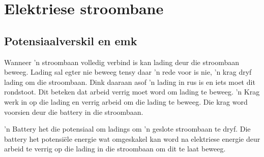 \chapter{Elektriese stroombane}

\section{Potensiaalverskil en emk}

Wanneer 'n stroombaan volledig verbind is kan lading deur die stroombaan
beweeg. Lading sal egter nie beweeg tensy daar 'n rede voor is nie, 'n krag dryf lading om die stroombaan. Dink daaraan asof 'n lading in rus is en iets
moet dit rondstoot. Dit beteken dat arbeid verrig moet word om lading te
beweeg. 'n Krag werk in op die lading en verrig arbeid om die lading te beweeg.
Die krag word voorsien deur die battery in die stroombaan.

'n Battery het die potensiaal om ladings om 'n geslote stroombaan te dryf. Die
battery het potensi\"ele energie wat omgeskakel kan word na elektriese energie
deur arbeid te verrig op die lading in die stroombaan om dit te laat beweeg.


